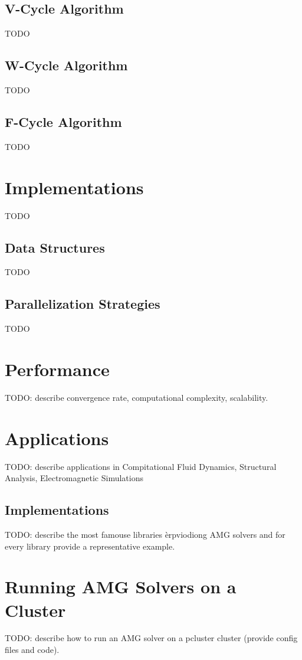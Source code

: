 \subsection{V-Cycle Algorithm}

TODO

\subsection{W-Cycle Algorithm}

TODO

\subsection{F-Cycle Algorithm}

TODO

\section{Implementations}

TODO

\subsection{Data Structures}

TODO

\subsection{Parallelization Strategies}

TODO

\section{Performance}

TODO: describe convergence rate, computational complexity, scalability.


\section{Applications}

TODO: describe applications in Compitational Fluid Dynamics, Structural Analysis, Electromagnetic Simulations

\subsection{Implementations}

TODO: describe the most famouse libraries èrpviodiong AMG solvers and for every library provide a representative example.

\section{Running AMG Solvers on a Cluster}

TODO: describe how to run an AMG solver on a pcluster cluster (provide config files and code).